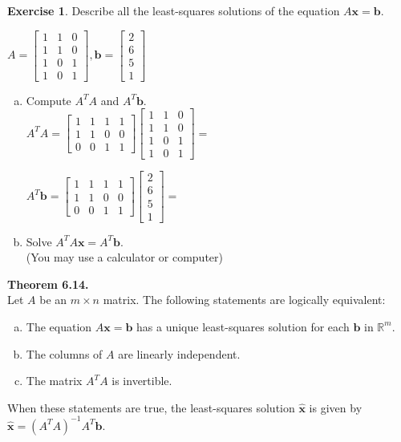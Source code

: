 \documentclass[10pt]{book}
\newcommand{\boxcolor}{gray!30}
\newenvironment{boxthm}{\begin{mdframed}[backgroundcolor=\boxcolor,nobreak=true]}{\end{mdframed}}
\theoremstyle{definition}
\newtheorem{exercise}{Exercise}[section]
\newcommand{\R}{\mathbb{R}}
\newcommand{\vect}[1]{\ensuremath{\boldsymbol{\mathbf{#1}}}}
\newcommand{\Axb}{A\vect{x}=\vect{b}}
\newcommand{\xhat}{\hat{\vect{x}}}
\newcommand{\NormEq}{A^TA\vect{x} = A^T\vect{b}}
\begin{document}
\begin{exercise} %
	Describe all the least-squares solutions of the equation $\Axb$.
	\begin{multicols}{2}
		$ A = \begin{bmatrix}1&1&0\\1&1&0\\1&0&1\\1&0&1\end{bmatrix}, 
		\vect{b} = \begin{bmatrix}2\\6\\5\\1\end{bmatrix} $
		\begin{enumerate}[(a)]
			\item Compute $A^TA$ and $A^T\vect{b}$. \\
			$ A^TA = \begin{bmatrix}1&1&1&1\\1&1&0&0\\0&0&1&1\end{bmatrix} \begin{bmatrix}1&1&0\\1&1&0\\1&0&1\\1&0&1\end{bmatrix} = $
			
			\vspace{2em}
			$ A^T\vect{b} = \begin{bmatrix}1&1&1&1\\1&1&0&0\\0&0&1&1\end{bmatrix} \begin{bmatrix}2\\6\\5\\1\end{bmatrix} = $
			\columnbreak
			\item Solve $\NormEq$. \\
			(You may use a calculator or computer)
		\end{enumerate}
	\end{multicols}
\end{exercise}
\vspace{2em}


\begin{boxthm}
	\textbf{Theorem 6.14.} \\
	Let $A$ be an $m\times n$ matrix. The following statements are logically equivalent:
	\vspace{-1ex}
	\begin{enumerate}[(a)]\itemsep=0em
		\item The equation $\Axb$ has a unique least-squares solution for each $\vect{b}$ in $\R^m$.
		\item The columns of $A$ are linearly independent.
		\item The matrix $A^TA$ is invertible.
	\end{enumerate}
	\vspace{-1ex}
	When these statements are true, the least-squares solution $\xhat$ is given by
	$ \xhat = \left(A^TA\right)^{-1}A^T\vect{b}. $
\end{boxthm}
\end{document}
